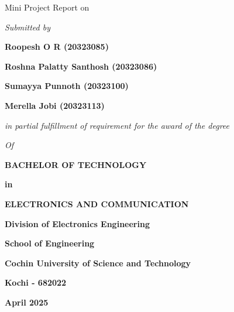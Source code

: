 \begin{titlepage}
	\titlepagefont
	\centering

	\vspace{\fill}
	{\subtitlefont Mini Project Report on \par}
	\vspace{.3cm}

	{ \par}

	\vspace{1cm}

	{\textit{Submitted by} \par}
	\vspace{.5cm}

	\textbf {Roopesh O R (20323085)} \par
	\textbf {Roshna Palatty Santhosh (20323086)} \par
	\textbf {Sumayya Punnoth (20323100)} \par
	\textbf {Merella Jobi (20323113)} \par

	\vspace{1cm}
	{\textit{in partial fulfillment of requirement for the award of the
	degree} \par}
	{\textit{Of}} \par
	\vspace{.6cm}
	{\textbf{BACHELOR OF TECHNOLOGY} \par}
	{\textbf{in}} \par
	{\textbf{ELECTRONICS AND COMMUNICATION} \par}
	\vspace{1cm}

	\par

	\vspace{1cm}

	{\textbf{Division of Electronics Engineering} \par}
	{\textbf{School of Engineering} \par}
	{\textbf{Cochin University of Science and Technology} \par}
	{\textbf{Kochi - 682022} \par}

	\vspace{.5cm}

	{\textbf{April 2025} \par}

	\vspace*{\fill}

\end{titlepage}

